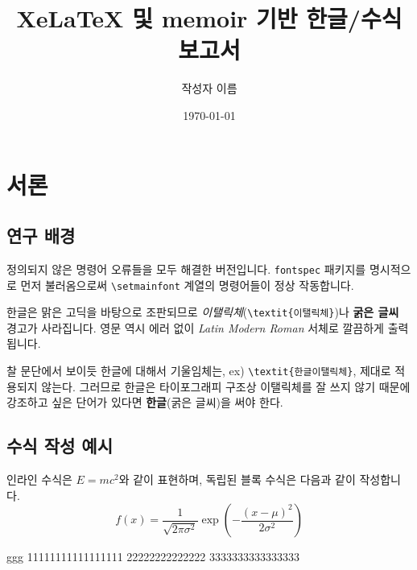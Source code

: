 \documentclass[12pt, a4paper, oneside]{memoir}
\title{XeLaTeX 및 memoir 기반 한글/수식 보고서}
\author{작성자 이름}
\date{\today}
\begin{document}
\maketitle

\tableofcontents
\newpage

\chapter{서론}
\section{연구 배경}
정의되지 않은 명령어 오류들을 모두 해결한 버전입니다. \texttt{fontspec} 패키지를 명시적으로 먼저 불러옴으로써 \texttt{\textbackslash setmainfont} 계열의 명령어들이 정상 작동합니다. 

한글은 맑은 고딕을 바탕으로 조판되므로 \textit{이탤릭체}(\verb|\textit{이탤릭체}|)나 \textbf{굵은 글씨} 경고가 사라집니다. 영문 역시 에러 없이 \textit{Latin Modern Roman} 서체로 깔끔하게 출력됩니다.

찰 문단에서 보이듯 한글에 대해서 기울임체는, ex) \verb|\textit{한글이탤릭체}|,  제대로 적용되지 않는다.
그러므로 한글은 타이포그래피 구조상 이탤릭체를 잘 쓰지 않기 때문에 강조하고 싶은 단어가 있다면 \textbf{한글}(굵은 글씨)을 써야 한다.

\section{수식 작성 예시}
인라인 수식은 $E = mc^2$와 같이 표현하며, 독립된 블록 수식은 다음과 같이 작성합니다.
\begin{equation}
    f(x) = \frac{1}{\sqrt{2\pi\sigma^2}} \exp\left( -\frac{(x-\mu)^2}{2\sigma^2} \right)
\end{equation}

ggg
11111111111111111
22222222222222
3333333333333333
\end{document}
